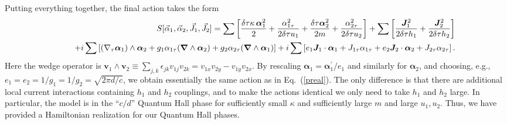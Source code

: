 Putting everything together, the final action takes the form
\begin{eqnarray*}
&& S[{\vec{\alpha}}_1, {\vec{\alpha}}_2, {\vec{J}}_1, {\vec{J}}_2] = 
\sum \left[ \frac{\delta\tau \kappa\, {\bm \alpha}_1^2}{2} + \frac{\alpha_{1\tau}^2}{2\delta\tau u_1} + \frac{\delta\tau {\bm \alpha}_2^2}{2m} + \frac{\alpha_{2\tau}^2}{2\delta\tau u_2} \right]
+ \sum \left[\frac{{\bm {J}}_1^2}{2\delta\tau h_1} + \frac{{\bm {J}}_2^2}{2\delta\tau h_2} \right] \\
&&\quad + i \sum \left[ (\nabla_\tau{\bm \alpha}_1) \wedge {\bm \alpha}_2 + g_1 \alpha_{1\tau} ({\bm \nabla} \wedge {\bm \alpha}_2) + g_2 \alpha_{2\tau} ({\bm \nabla} \wedge {\bm \alpha}_1) \right]
+ i \sum \left[ e_1 {\bm {J}}_1 \cdot {\bm \alpha}_1 + J_{1\tau} \alpha_{1\tau} + e_2 {\bm {J}}_2 \cdot {\bm \alpha}_2 + J_{2\tau} \alpha_{2\tau} \right] . 
\end{eqnarray*}
Here the wedge operator is ${\bm v}_1 \wedge {\bm v}_2 \equiv \sum_{j,k} \epsilon_{jk} v_{1j} v_{2k} = v_{1x} v_{2y} - v_{1y} v_{2x}$.
By rescaling ${\bm \alpha}_1 = {\bm \alpha}^\prime_1/e_1$ and similarly for  ${\bm \alpha}_2$, and choosing, e.g., $e_1 = e_2 = 1/g_1 = 1/g_2 = \sqrt{2\pi d/c}$, we obtain essentially the same action as in Eq.~(\ref{preal}).  The only difference is that there are additional local current interactions containing $h_1$ and $h_2$ couplings, and to make the actions identical we only need to take $h_1$ and $h_2$ large.  In particular, the model is in the ``$c/d$'' Quantum Hall phase for sufficiently small $\kappa$ and sufficiently large $m$ and large $u_1, u_2$.
Thus, we have provided a Hamiltonian realization for our Quantum Hall phases.

